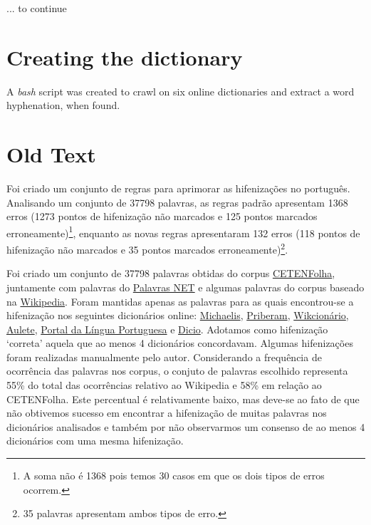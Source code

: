 \documentclass{article}
\begin{document}
... to continue
\vspace{10ex}



\section{Creating the dictionary}
A \emph{bash} script was created to crawl on six online dictionaries and extract a word hyphenation, when found. 



\section{Old Text}


Foi criado um conjunto de \NumberOfNewRules{} regras para aprimorar as hifenizações no
português. Analisando um conjunto de 37798 palavras, as regras padrão apresentam
1368 erros (1273 pontos de hifenização não marcados e 125 pontos marcados
erroneamente)\footnote{A soma não é 1368 pois temos 30 casos em que os dois
tipos de erros ocorrem.}, enquanto as novas regras apresentaram 132 erros (118
pontos de hifenização não marcados e 35 pontos marcados
erroneamente)\footnote{35 palavras apresentam ambos tipos de erro.}.

Foi criado um conjunto de 37798 palavras obtidas do corpus
\href{https://www.linguateca.pt/cetenfolha/index_info.html}{CETENFolha},
juntamente com palavras do \href{https://www.palavras.net/}{Palavras NET} e
algumas palavras do corpus baseado na
\href{https://pt.wikipedia.org}{Wikipedia}. 
Foram mantidas apenas as palavras
para as quais encontrou-se a hifenização nos seguintes dicionários online:
\href{https://michaelis.uol.com.br/}{Michaelis},
\href{https://dicionario.priberam.org/}{Priberam},
\href{https://pt.wiktionary.org}{Wikcionário},
\href{https://aulete.com.br/}{Aulete},
\href{http://www.portaldalinguaportuguesa.org/}{Portal da Língua Portuguesa} e
\href{https://www.dicio.com.br/}{Dicio}.
Adotamos como hifenização `correta' aquela que ao menos 4 dicionários
concordavam. Algumas hifenizações foram realizadas manualmente pelo autor.
Considerando a frequência de ocorrência das palavras nos corpus, o conjuto de
palavras escolhido representa 55\% do total das ocorrências relativo ao
Wikipedia e 58\% em relação ao CETENFolha.
%
% 
%
%
Este percentual é relativamente baixo, mas deve-se ao fato de que não obtivemos
sucesso em encontrar a hifenização de muitas palavras nos dicionários
analisados e também por não observarmos um consenso de ao menos 4 dicionários
com uma mesma hifenização.
\end{document}
